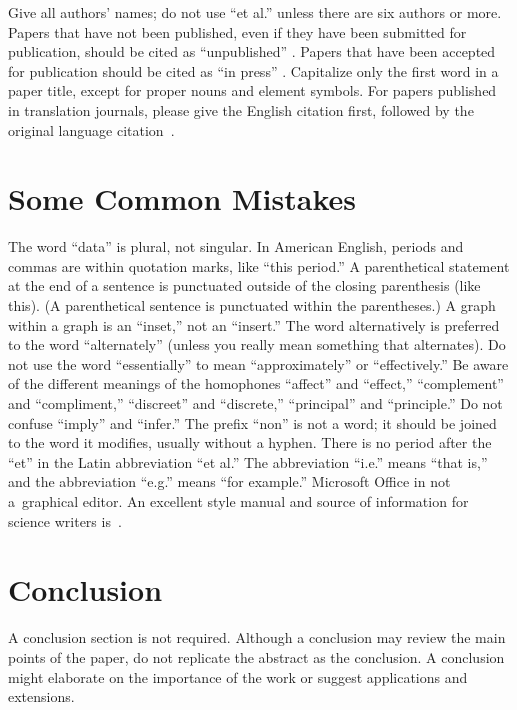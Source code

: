 \documentclass[conference]{IEEEtran}
\theoremstyle{definition}
\begin{document}
Give all authors' names; do not use ``et al.'' unless there are six authors or more.  Papers that have not been published, even if they have been submitted for publication, should be cited as ``unpublished'' \cite{cu}.  Papers that have been accepted for publication should be cited as ``in press'' \cite{cin}.  Capitalize only the first word in a paper title, except for proper nouns and element symbols.
For papers published in translation journals, please give the English citation first, followed by the original language citation~\cite{ctr}.

\balance



\section{Some Common Mistakes}
The word ``data'' is plural, not singular.  In American English, periods and commas are within quotation marks, like ``this period.''  A parenthetical statement at the end of a sentence is punctuated outside of the closing parenthesis (like this).  (A parenthetical sentence is punctuated within the parentheses.)  A graph within a graph is an ``inset,'' not an ``insert.''  The word alternatively is preferred to the word ``alternately'' (unless you really mean something that alternates).  Do not use the word ``essentially'' to mean ``approximately'' or ``effectively.''  Be aware of the different meanings of the homophones ``affect'' and ``effect,'' ``complement'' and ``compliment,'' ``discreet'' and ``discrete,'' ``principal'' and ``principle.''  Do not confuse ``imply'' and ``infer.''  The prefix ``non'' is not a word; it should be joined to the word it modifies, usually without a hyphen.  There is no period after the ``et'' in the Latin abbreviation ``et al.''  The abbreviation ``i.e.'' means ``that is,'' 
and the abbreviation ``e.g.'' means ``for example.'' Microsoft Office in not a~graphical editor. An excellent style manual and source of information for science writers is~\cite{c7}.

\section{Conclusion}
A conclusion section is not required. Although a conclusion may review the main points of the paper, do not replicate the abstract as the conclusion. A conclusion might elaborate on the importance of the work or suggest applications and extensions. 
\end{document}
